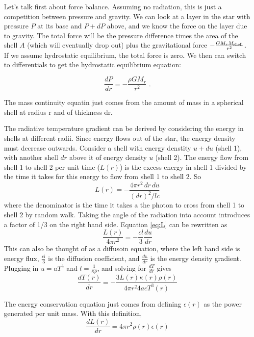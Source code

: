Let's talk first about force balance. Assuming no radiation, this is just a competition between pressure and gravity. We can look at a layer in the star with pressure $P$ at its base and $P+dP$ above, and we know the force on the layer due to gravity. The total force will be the pressure difference times the area of the shell $A$ (which will eventually drop out) plus the gravitational force $-\frac{G M_r M_{\rm shell}}{r^2}$. If we assume hydrostatic equilibrium, the total force is zero. We then can switch to differentials to get the hydrostatic equilibrium equation:

\begin{equation}
\frac{dP}{dr} = -\frac{\rho G M_r}{r^2}\,\,.
\end{equation}

The mass continuity equatin just comes from the amount of mass in a spherical shell at radius r 
and of thickness dr.

The radiative temperature gradient can be derived by considering the energy in shells at different 
radii.  Since energy flows out of the star, the energy density must decrease outwards.  Consider 
a shell with energy denstity $u+du$ (shell 1), with another shell $dr$ above it of energy 
density $u$ (shell 2).  The energy flow from shell 1 to shell 2 per unit time ($L(r)$) is 
the excess energy in shell 1 divided by the time it takes for this energy to flow from shell 1 to 
shell 2.  So
\begin{equation}\label{eq:L}
L(r)=-\frac{4\pi r^2\,dr\,du}{(dr)^2/lc}
\end{equation}
where the denominator is the time it takes a the photon to cross from shell 1 to shell 2 by random 
walk.  Taking the angle of the radiation into account introduces a factor of 1/3 on the right hand 
side.  Equation \ref{eq:L} can be rewritten as 
\begin{equation}
\frac{L(r)}{4\pi r^2}=-\frac{cl}{3}\frac{du}{dr}
\end{equation}
This can also be thought of as a diffusoin equation, where the left hand side is energy flux, 
$\frac{cl}{3}$ is the diffusion coefficient, and $\frac{du}{dr}$ is the energy density gradient.  
Plugging in $u=aT^4$ and $l=\frac{1}{\kappa\rho}$, and solving for $\frac{dT}{dr}$ gives
\begin{equation}\label{eq:rad}
\boxed{\frac{dT(r)}{dr}=-\frac{3L(r)\kappa(r)\rho(r)}{4\pi r^2 4acT^3(r)}}
\end{equation}

The energy conservation equation just comes from defining $\epsilon(r)$ as the power generated 
per unit mass.  With this definition,
\begin{equation}
\boxed{\frac{dL(r)}{dr}=4\pi r^2\rho (r)\epsilon (r)}
\end{equation}

